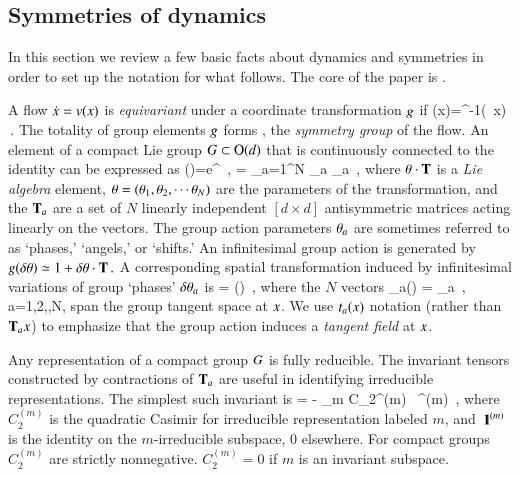 \subsection{Symmetries of dynamics}
\label{sec:SymmDyn}

In this section we review a few basic facts about dynamics and symmetries in
order to set up the notation for what follows. The core of the paper is
.

A flow $\dot{x}= v(x)$ is \emph{equivariant} under a coordinate
transformation $g$ if
\beq
\vel(x)=\LieEl^{-1}\vel(\LieEl \, x)
\,.
The totality of group elements
$g$ forms \Group, the {\em symmetry group} of the flow.
An element of a compact Lie group $G \subset \textrm{O}(d)$ that is
continuously connected to the identity can be expressed as
\beq
\LieEl(\gSpace)=e^{{\gSpace} \cdot \Lg }
    \,,\qquad
\gSpace \cdot \Lg = \sum_{a=1}^N \gSpace_a \Lg_a
\,,
where ${\bf \theta} \cdot \mathbf{T} $ is a \emph{Lie algebra} element, ${\bf \theta}
= ({\bf \theta}_1,{\bf \theta}_2,\cdots{\bf \theta}_N)$ are the parameters of the
transformation, and the $\mathbf{T}_a$ are a set of $N$ linearly independent
$[d\!\times\!d]$ antisymmetric matrices acting linearly on the {\statesp}
vectors. The group action parameters ${\bf \theta}_a$ are sometimes referred to as
`phases,' `angels,' or `shifts.'
An infinitesimal group action is generated by
$
g(\delta {\bf \theta}) \simeq 1 + \delta {\bf \theta} \cdot \mathbf{T}
\,.
$ %
A corresponding spatial transformation induced by infinitesimal
variations of group `phases' $\delta {\bf \theta}_a$ is
\beq
\delta {\ssp} = \delta \gSpace \cdot \groupTan(\ssp)
\,,
where the $N$ vectors
\beq
 \groupTan_{a}(\ssp) = \Lg _{a} \ssp
    \,,\qquad
 a=1,2,\cdots,N,
span the group tangent space at $x$. We use $t_a(x)$
notation (rather than $\mathbf{T}_{a}x$) to emphasize that the group action
induces a \emph{tangent field} at $x$.

Any representation of a compact group $G$ is fully
reducible. The invariant tensors constructed by contractions
of $\mathbf{T}_a$ are useful in identifying irreducible
representations. The simplest such invariant is
\beq
{\Lg} \cdot \Lg = - \sum_m C_2^{(m)} \, \id^{(m)}
\,,
where $C_2^{(m)}$ is the quadratic Casimir for irreducible representation
labeled $m$, and ${\ \hbox{{\rm 1}\kern-.6em\hbox{\rm 1}}}^{(m)}$ is the identity on the $m$-irreducible
subspace, 0 elsewhere. For compact groups $C_2^{(m)}$ are strictly
nonnegative. $C_2^{(m)} =0$ if $m$ is an invariant subspace.

